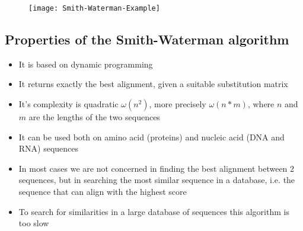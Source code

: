 \begin{figure}[H]
  \centering
  \texttt{[image: Smith-Waterman-Example]}
\end{figure}

\subsection{Properties of the Smith-Waterman algorithm}

\begin{itemize}
  \item It is based on dynamic programming
  \item It returns exactly the best alignment, given a suitable substitution
 matrix
  \item It's complexity is quadratic $\omega(n^2)$, more precisely
$\omega(n*m)$, where $n$ and $m$ are the lengths of the two sequences
  \item It can be used both on amino acid (proteins) and nucleic acid (DNA and
RNA) sequences
  \item In most cases we are not concerned in finding the best alignment
between 2 sequences, but in searching the most similar sequence in a database,
i.e. the sequence that can align with the highest score
  \item To search for similarities in a large database of sequences this
algorithm is too slow
\end{itemize}
